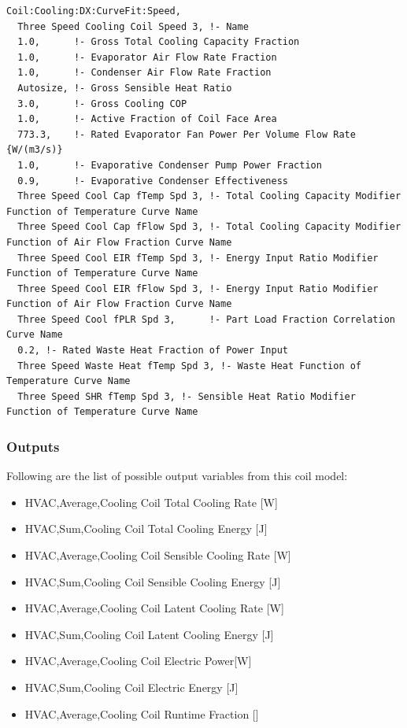 \begin{lstlisting}
Coil:Cooling:DX:CurveFit:Speed,
  Three Speed Cooling Coil Speed 3, !- Name
  1.0,      !- Gross Total Cooling Capacity Fraction
  1.0,      !- Evaporator Air Flow Rate Fraction
  1.0,      !- Condenser Air Flow Rate Fraction
  Autosize, !- Gross Sensible Heat Ratio
  3.0,      !- Gross Cooling COP
  1.0,      !- Active Fraction of Coil Face Area
  773.3,    !- Rated Evaporator Fan Power Per Volume Flow Rate {W/(m3/s)}
  1.0,      !- Evaporative Condenser Pump Power Fraction
  0.9,      !- Evaporative Condenser Effectiveness
  Three Speed Cool Cap fTemp Spd 3, !- Total Cooling Capacity Modifier Function of Temperature Curve Name
  Three Speed Cool Cap fFlow Spd 3, !- Total Cooling Capacity Modifier Function of Air Flow Fraction Curve Name
  Three Speed Cool EIR fTemp Spd 3, !- Energy Input Ratio Modifier Function of Temperature Curve Name
  Three Speed Cool EIR fFlow Spd 3, !- Energy Input Ratio Modifier Function of Air Flow Fraction Curve Name
  Three Speed Cool fPLR Spd 3,      !- Part Load Fraction Correlation Curve Name
  0.2, !- Rated Waste Heat Fraction of Power Input
  Three Speed Waste Heat fTemp Spd 3, !- Waste Heat Function of Temperature Curve Name
  Three Speed SHR fTemp Spd 3, !- Sensible Heat Ratio Modifier Function of Temperature Curve Name

\end{lstlisting}

\subsubsection{Outputs}\label{outputs-01}

Following are the list of possible output variables from this coil model:

\begin{itemize}
\item
  HVAC,Average,Cooling Coil Total Cooling Rate {[}W{]}
\item
  HVAC,Sum,Cooling Coil Total Cooling Energy {[}J{]}
\item
  HVAC,Average,Cooling Coil Sensible Cooling Rate {[}W{]}
\item
  HVAC,Sum,Cooling Coil Sensible Cooling Energy {[}J{]}
\item
  HVAC,Average,Cooling Coil Latent Cooling Rate {[}W{]}
\item
  HVAC,Sum,Cooling Coil Latent Cooling Energy {[}J{]}
\item
  HVAC,Average,Cooling Coil Electric Power{[}W{]}
\item
  HVAC,Sum,Cooling Coil Electric Energy {[}J{]}
\item
  HVAC,Average,Cooling Coil Runtime Fraction {[]}
\end{itemize}

